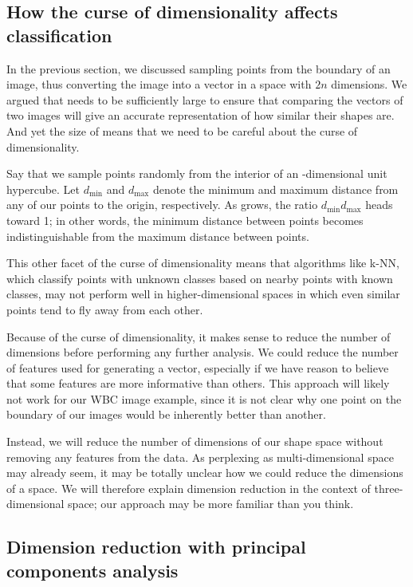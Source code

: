 \FloatBarrier
{}
\subsection{How the curse of dimensionality affects classification}

In the previous section, we discussed sampling  points from the boundary of an image, thus converting the image into a vector in a space with $2n$ dimensions. We argued that  needs to be sufficiently large to ensure that comparing the vectors of two images will give an accurate representation of how similar their shapes are. And yet the size of  means that we need to be careful about the curse of dimensionality.

Say that we sample  points randomly from the interior of an -dimensional unit hypercube. Let $d_{\text{min}}$ and $d_{\text{max}}$ denote the minimum and maximum distance from any of our points to the origin, respectively. As  grows, the ratio $d_{\text{min}}d_{\text{max}}$ heads toward 1; in other words, the minimum distance between points becomes indistinguishable from the maximum distance between points.

This other facet of the curse of dimensionality means that algorithms like k-NN, which classify points with unknown classes based on nearby points with known classes, may not perform well in higher-dimensional spaces in which even similar points tend to fly away from each other.

Because of the curse of dimensionality, it makes sense to reduce the number of dimensions before performing any further analysis. We could reduce the number of features used for generating a vector, especially if we have reason to believe that some features are more informative than others. This approach will likely not work for our WBC image example, since it is not clear why one point on the boundary of our images would be inherently better than another.

Instead, we will reduce the number of dimensions of our shape space without removing any features from the data. As perplexing as multi-dimensional space may already seem, it may be totally unclear how we could reduce the dimensions of a space. We will therefore explain dimension reduction in the context of three-dimensional space; our approach may be more familiar than you think.

\FloatBarrier
{}
\subsection{Dimension reduction with principal components analysis}

